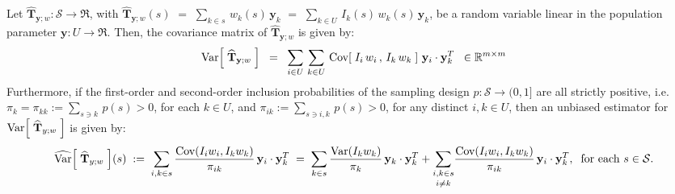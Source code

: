 \documentclass{article}
\begin{document}
\begin{proposition}
\label{proposition:generalLinear:Var}
\mbox{}
\vskip 0.2cm
\noindent
Let $\widehat{\mathbf{T}}_{\mathbf{y};w} : \mathcal{S} \longrightarrow \Re$,
with $\widehat{\mathbf{T}}_{\mathbf{y};w}(s)$
$=$ $\underset{k \in s}{\sum}\,w_{k}(s)\,\mathbf{y}_{k}$
$=$ $\underset{k \in U}{\sum}\,I_{k}(s)\,w_{k}(s)\,\mathbf{y}_{k}$,
be a random variable linear in the population parameter $\mathbf{y} : U \longrightarrow \Re$.
Then, the covariance matrix of $\widehat{\mathbf{T}}_{\mathbf{y};w}$ is given by:
\begin{equation*}
\textnormal{Var}\!\left[\;\widehat{\mathbf{T}}_{\mathbf{y};w}\;\right]
\;\;=\;\;\sum_{i\in U}\,\sum_{k\in U}\,\textnormal{Cov}\!\left[\;I_{i}\,w_{i}\,,\,I_{k}\,w_{k}\;\right]\,\mathbf{y}_{i}\cdot\mathbf{y}_{k}^{T}
\;\; \in \mathbb{R}^{m \times m}
\end{equation*}
Furthermore, if the first-order and second-order inclusion probabilities of the sampling design
$p : \mathcal{S} \longrightarrow (0,1]$ are all strictly positive,
i.e. $\pi_{k} = \pi_{kk} := \underset{s \ni k}{\sum}\,p(s) > 0$, for each $k \in U$, and
$\pi_{ik} := \underset{s \ni i,k}{\sum}\,p(s) > 0$, for any distinct $i,k \in U$,
then an unbiased estimator for $\textnormal{Var}\!\left[\;\widehat{\mathbf{T}}_{y;w}\;\right]$ is given by:
\begin{equation*}
\widehat{\textnormal{Var}}\!\left[\;\widehat{\mathbf{T}}_{y;w}\;\right]\!(s)
\;:=\; \sum_{i,k \in s}\dfrac{\textnormal{Cov}(I_{i}w_{i},I_{k}w_{k})}{\pi_{ik}}\,\mathbf{y}_{i}\cdot\mathbf{y}_{k}^{T}
\;=\; \sum_{k \in s}\dfrac{\textnormal{Var}(I_{k}w_{k})}{\pi_{k}}\,\mathbf{y}_{k}\cdot\mathbf{y}_{k}^{T}
       + \underset{i \neq k}{\sum_{i,k \in s}}\dfrac{\textnormal{Cov}(I_{i}w_{i},I_{k}w_{k})}{\pi_{ik}}\,\mathbf{y}_{i}\cdot\mathbf{y}_{k}^{T},
\;\;\textnormal{for each $s \in \mathcal{S}$}.
\end{equation*}
\end{proposition}
\end{document}
